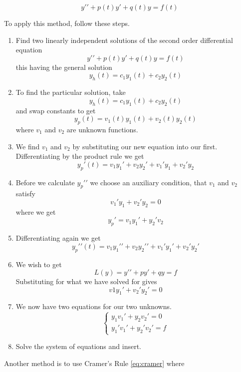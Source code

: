        \[ y\prime\prime + p(t)y\prime + q(t)y = f(t) \]

    To apply this method, follow these steps.

        \begin{enumerate}
            \item Find two linearly independent solutions of the second order differential equation
                    \[ y\prime\prime + p(t)y\prime + q(t)y = f(t) \]
                this having the general solution
                \[ y_h(t) = c_1 y_1(t) + c_2y_2(t) \]
            \item To find the particular solution, take
                \[ y_h(t) = c_1 y_1(t) + c_2y_2(t) \]
                and swap constants to get
                \[ y_p(t) = v_1(t) y_1(t) + v_2(t)y_2(t) \]
                where $v_1$ and $v_2$ are unknown functions.
            \item We find $v_1$ and $v_2$ by substituting our new equation into our first. Differentiating by the product rule we get
                \[ y_p\prime(t) = v_1 y_1\prime + v_2y_2\prime + v_1\prime y_1 + v_2\prime y_2 \]
            \item Before we calculate $y_p\prime\prime$ we choose an auxiliary condition, that $v_1$ and $v_2$ satisfy
                \[ v_1\prime y_1 + v_2\prime y_2 = 0 \]
                where we get
                \[ y_p \prime = v_1 y_1\prime + y_2\prime v_2 \]
            \item Differentiating again we get
                \[ y_p\prime\prime(t) = v_1 y_1\prime\prime + v_2 y_2\prime\prime + v_1\prime y_1\prime + v_2\prime y_2\prime \]
            \item We wish to get
                \[ L(y) = y\prime\prime + py\prime + qy = f \]
                Substituting for what we have solved for gives
                \[ v1 y_1\prime + v_2\prime y_2\prime = 0 \]
            \item We now have two equations for our two unknowns.
                \[ \begin{cases}
                    y_1 v_1\prime + y_2 v_2\prime = 0\\
                    y_1\prime v_1\prime + y_2\prime v_2\prime = f
                 \end{cases} \]
            \item Solve the system of equations and insert.
        \end{enumerate}

    Another method is to use Cramer's Rule \eqref{eq:cramer} where

